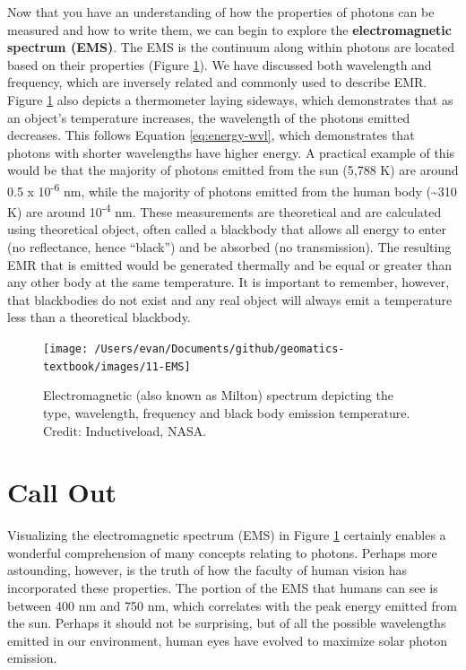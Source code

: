 \documentclass[
]{book}
\begin{document}
Now that you have an understanding of how the properties of photons can
be measured and how to write them, we can begin to explore the
\textbf{electromagnetic spectrum (EMS)}. The EMS is the continuum along
within photons are located based on their properties (Figure
\ref{fig:11-EMS}). We have discussed both wavelength and frequency,
which are inversely related and commonly used to describe EMR. Figure
\ref{fig:11-EMS} also depicts a thermometer laying sideways, which
demonstrates that as an object's temperature increases, the wavelength
of the photons emitted decreases. This follows Equation
\eqref{eq:energy-wvl}, which demonstrates that photons with shorter
wavelengths have higher energy. A practical example of this would be
that the majority of photons emitted from the sun (5,788 K) are around
0.5 x 10\textsuperscript{-6} nm, while the majority of photons emitted from the human
body (\textasciitilde310 K) are around 10\textsuperscript{-4} nm. These measurements are theoretical
and are calculated using theoretical object, often called a blackbody
that allows all energy to enter (no reflectance, hence ``black'') and
be absorbed (no transmission). The resulting EMR that is emitted would
be generated thermally and be equal or greater than any other body at
the same temperature. It is important to remember, however, that
blackbodies do not exist and any real object will always emit a
temperature less than a theoretical blackbody.

\begin{figure}
\texttt{[image: /Users/evan/Documents/github/geomatics-textbook/images/11-EMS]} \caption{Electromagnetic (also known as Milton) spectrum depicting the type, wavelength, frequency and black body emission temperature. Credit: Inductiveload, NASA.}\label{fig:11-EMS}
\end{figure}

\hypertarget{call-out-2}{%
\section*{Call Out}\label{call-out-2}}

Visualizing the electromagnetic spectrum (EMS) in Figure \ref{fig:11-EMS} certainly
enables a wonderful comprehension of many concepts relating to photons.
Perhaps more astounding, however, is the truth of how the faculty of
human vision has incorporated these properties. The portion of the EMS
that humans can see is between 400 nm and 750 nm, which correlates with
the peak energy emitted from the sun. Perhaps it should not be
surprising, but of all the possible wavelengths emitted in our
environment, human eyes have evolved to maximize solar photon emission.
\end{document}
